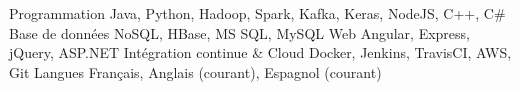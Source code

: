\begin{cvskills}
    \cvskill
        {Programmation}
        {Java, Python, Hadoop, Spark, Kafka, Keras, NodeJS, C++, C\#}
    \cvskill
        {Base de données}
        {NoSQL, HBase, MS SQL, MySQL}
    \cvskill
        {Web}
        {Angular, Express, jQuery, ASP.NET}
    \cvskill
        {Intégration continue \& Cloud}
        {Docker, Jenkins, TravisCI, AWS, Git}
    \cvskill
        {Langues}
        {Français, Anglais (courant), Espagnol (courant)}
\end{cvskills}